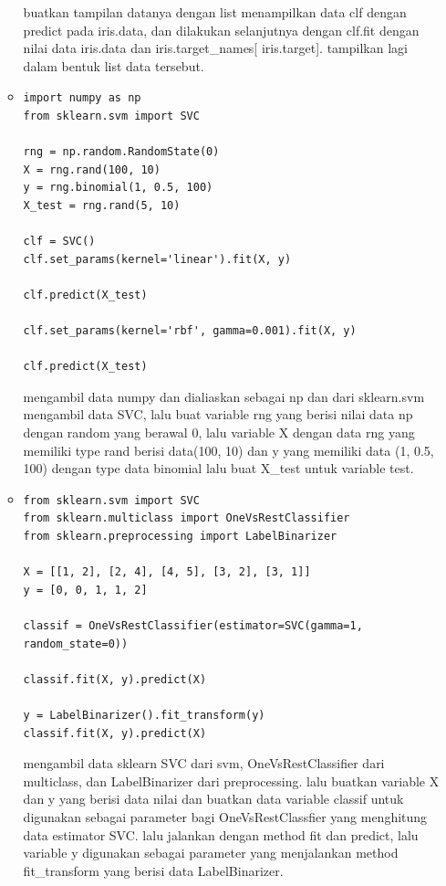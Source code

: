 \begin{enumerate}
\begin{itemize}
buatkan tampilan datanya dengan list menampilkan data clf dengan predict pada iris.data, dan dilakukan selanjutnya dengan clf.fit dengan nilai data iris.data dan iris.target\_names[ iris.target]. tampilkan lagi dalam bentuk list data tersebut.

\item
\begin{verbatim}
import numpy as np
from sklearn.svm import SVC

rng = np.random.RandomState(0)
X = rng.rand(100, 10)
y = rng.binomial(1, 0.5, 100)
X_test = rng.rand(5, 10)

clf = SVC()
clf.set_params(kernel='linear').fit(X, y)

clf.predict(X_test)

clf.set_params(kernel='rbf', gamma=0.001).fit(X, y)

clf.predict(X_test)
\end{verbatim}
\subitem
mengambil data numpy dan dialiaskan sebagai np dan dari sklearn.svm mengambil data SVC,  lalu buat variable rng yang berisi nilai data np dengan random yang berawal 0, lalu variable X dengan data rng yang memiliki type rand berisi data(100, 10) dan y yang memiliki data (1, 0.5, 100) dengan type data binomial lalu buat X\_test untuk variable test.

\item
\begin{verbatim}
from sklearn.svm import SVC
from sklearn.multiclass import OneVsRestClassifier
from sklearn.preprocessing import LabelBinarizer

X = [[1, 2], [2, 4], [4, 5], [3, 2], [3, 1]]
y = [0, 0, 1, 1, 2]

classif = OneVsRestClassifier(estimator=SVC(gamma=1, random_state=0))

classif.fit(X, y).predict(X)

y = LabelBinarizer().fit_transform(y)
classif.fit(X, y).predict(X)
\end{verbatim}
\subitem
mengambil data sklearn SVC dari svm, OneVsRestClassifier dari multiclass, dan LabelBinarizer dari preprocessing. lalu buatkan variable X dan y yang berisi data nilai dan buatkan data variable classif untuk digunakan sebagai parameter bagi OneVsRestClassfier yang menghitung data estimator SVC. lalu jalankan dengan method fit dan predict, lalu variable y digunakan sebagai parameter yang menjalankan method fit\_transform yang berisi data LabelBinarizer.


\end{itemize}
\end{enumerate}
